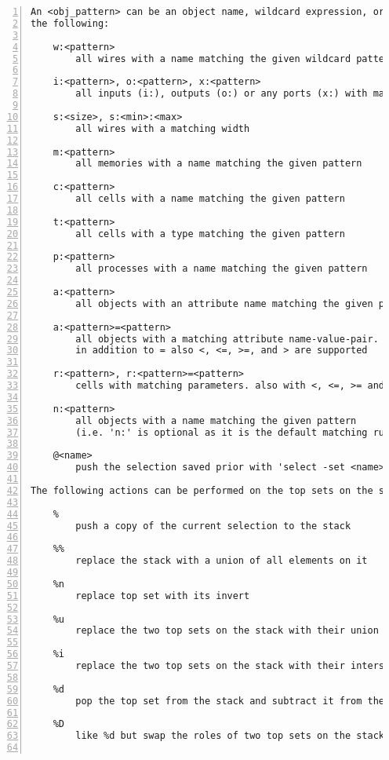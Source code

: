 \begin{lstlisting}[numbers=left,frame=single]
An <obj_pattern> can be an object name, wildcard expression, or one of
the following:

    w:<pattern>
        all wires with a name matching the given wildcard pattern

    i:<pattern>, o:<pattern>, x:<pattern>
        all inputs (i:), outputs (o:) or any ports (x:) with matching names

    s:<size>, s:<min>:<max>
        all wires with a matching width

    m:<pattern>
        all memories with a name matching the given pattern

    c:<pattern>
        all cells with a name matching the given pattern

    t:<pattern>
        all cells with a type matching the given pattern

    p:<pattern>
        all processes with a name matching the given pattern

    a:<pattern>
        all objects with an attribute name matching the given pattern

    a:<pattern>=<pattern>
        all objects with a matching attribute name-value-pair.
        in addition to = also <, <=, >=, and > are supported

    r:<pattern>, r:<pattern>=<pattern>
        cells with matching parameters. also with <, <=, >= and >.

    n:<pattern>
        all objects with a name matching the given pattern
        (i.e. 'n:' is optional as it is the default matching rule)

    @<name>
        push the selection saved prior with 'select -set <name> ...'

The following actions can be performed on the top sets on the stack:

    %
        push a copy of the current selection to the stack

    %%
        replace the stack with a union of all elements on it

    %n
        replace top set with its invert

    %u
        replace the two top sets on the stack with their union

    %i
        replace the two top sets on the stack with their intersection

    %d
        pop the top set from the stack and subtract it from the new top

    %D
        like %d but swap the roles of two top sets on the stack


\end{lstlisting}

